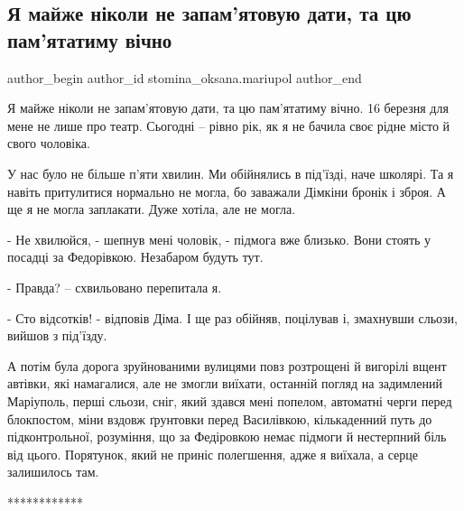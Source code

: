  
 
 
 
 

\subsection{Я майже ніколи не запам’ятовую дати, та цю пам’ятатиму вічно}
\label{sec:17_03_2023.fb.stomina_oksana.mariupol.1.daty_pamjatatymu_vichno}

\ifcmt
 author_begin
   author_id stomina_oksana.mariupol
 author_end
\fi

Я майже ніколи не запам'ятовую дати, та цю пам'ятатиму вічно. 16 березня для
мене не лише про театр. Сьогодні – рівно рік, як я не бачила своє рідне місто й
свого чоловіка. 

У нас було не більше п'яти хвилин. Ми обійнялись в під'їзді, наче школярі. Та я
навіть притулитися нормально не могла, бо заважали Дімкіни бронік і зброя. А ще
я не могла заплакати. Дуже хотіла, але не могла. 

- Не хвилюйся, - шепнув мені чоловік, - підмога вже близько. Вони стоять у
посадці за Федорівкою. Незабаром будуть тут.

- Правда? – схвильовано перепитала я.

- Сто відсотків! - відповів Діма. І ще раз обійняв, поцілував  і, змахнувши
сльози, вийшов з під'їзду. 

А потім була дорога зруйнованими вулицями повз розтрощені й вигорілі вщент
автівки, які намагалися, але не змогли виїхати, останній погляд на задимлений
Маріуполь, перші сльози, сніг, який здався мені попелом, автоматні черги перед
блокпостом, міни вздовж ґрунтовки перед Василівкою, кількаденний путь до
підконтрольної, розуміння, що за Федіровкою немає підмоги й нестерпний біль від
цього.  Порятунок, який не приніс полегшення, адже я виїхала, а серце
залишилось там.

************

